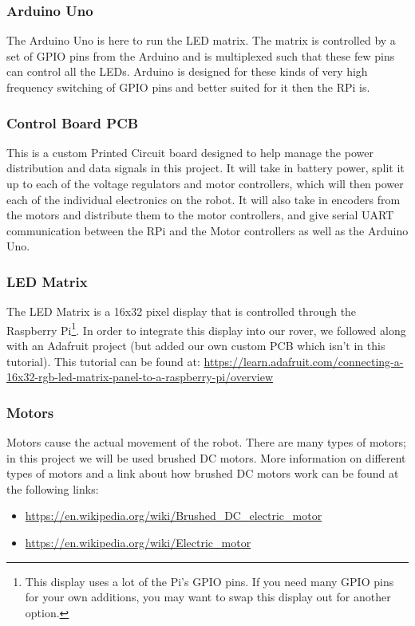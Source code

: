 \documentclass[12pt]{article}
\begin{document}
\subsubsection{Arduino Uno}
The Arduino Uno is here to run the LED matrix. The matrix is controlled by a set of GPIO pins from the Arduino and is multiplexed such that these few pins can control all the LEDs. Arduino is designed for these kinds of very high frequency switching of GPIO pins and better suited for it then the RPi is.
\subsubsection{Control Board PCB}
This is a custom Printed Circuit board designed to help manage the power distribution and data signals in this project. It will take in battery power, split it up to each of the voltage regulators and motor controllers, which will then power each of the individual  electronics on the robot. It will also take in encoders from the motors and distribute them to the motor controllers, and give serial UART communication between the RPi and the Motor controllers as well as the Arduino Uno.

\subsubsection{LED Matrix}
The LED Matrix is a 16x32 pixel display that is controlled through the Raspberry Pi\footnote{This display uses a lot of the Pi's GPIO pins.  If you need many GPIO pins for your own additions, you may want to swap this display out for another option.}. In order to integrate this display into our rover, we followed along with an Adafruit project (but added our own custom PCB which isn't in this tutorial). This tutorial can be found at: \href{https://learn.adafruit.com/connecting-a-16x32-rgb-led-matrix-panel-to-a-raspberry-pi/overview}{https://learn.adafruit.com/connecting-a-16x32-rgb-led-matrix-panel-to-a-raspberry-pi/overview}

\subsubsection{Motors}
Motors cause the actual movement of the robot. There are many types of motors; in this project we will be used brushed DC motors. More information on different types of motors and a link about how brushed DC motors work can be found at the following links:
\begin{itemize}
	\item \href{https://en.wikipedia.org/wiki/Brushed_DC_electric_motor}{https://en.wikipedia.org/wiki/Brushed\_DC\_electric\_motor}
	\item \href{https://en.wikipedia.org/wiki/Electric_motor}{https://en.wikipedia.org/wiki/Electric\_motor}
\end{itemize}
\end{document}
